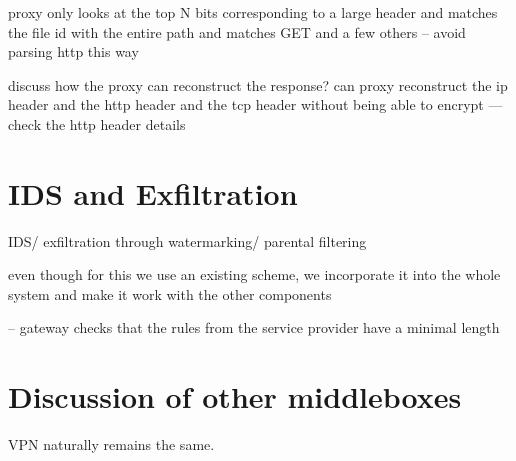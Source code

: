 proxy only looks at the top N bits corresponding to a large header and matches the file id with the entire path
and matches GET and a few others -- avoid parsing http this way


discuss how the proxy can reconstruct the response?
can proxy reconstruct the ip header and the http header  and the tcp header without being able to encrypt
--- check the http header details

\section{IDS and Exfiltration}\label{sec:IDS}

IDS/ exfiltration through watermarking/ parental filtering

even though for this we use an existing scheme, we incorporate it into the whole
system and make it work with the other components

-- gateway checks that the rules from the service provider have a minimal length 


\section{Discussion of other middleboxes}\label{sec:vpn} \label{sec:other} \label{sec:not_supp}

VPN naturally remains the same. 